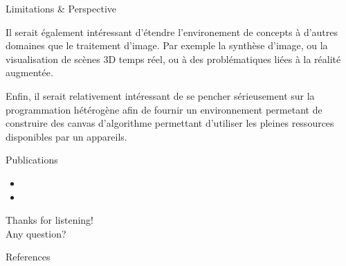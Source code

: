 \documentclass[12pt,aspectratio=169]{beamer}
\newcommand{\themename}{\textbf{\textsc{metropolis}}\xspace}
\begin{document}
\begin{frame}{Limitations \& Perspective}
{    Il serait également intéressant d'étendre l'environement de concepts à d'autres domaines que le traitement d'image. Par exemple la synthèse d'image, ou la visualisation de scènes 3D temps réel, ou à des problématiques liées à la réalité augmentée.

    Enfin, il serait relativement intéressant de se pencher sérieusement sur la programmation hétérogène afin de fournir un environnement permetant de construire des canvas d'algorithme permettant d'utiliser les pleines ressources disponibles par un appareils.
  }
\end{frame}

\begin{frame}[allowframebreaks]{Publications}
  \footnotesize
  \begin{itemize}
    \item {}
    \item {}
  \end{itemize}
\end{frame}

{
\begin{frame}[standout]
  Thanks for listening!\\
  Any question?
\end{frame}
}

\maketitle

\appendix

\nocite{geraud.2008.mpool,levillain.2014.ciarp,levillain.2009.ismm,niebler.2014.ranges,roynard.2022.gpce,roynard.2019.rrpr}
\begin{frame}[allowframebreaks]{References}
  \AtNextBibliography{\footnotesize}
  \printbibliography[heading=none]
\end{frame}

%
%
\end{document}
